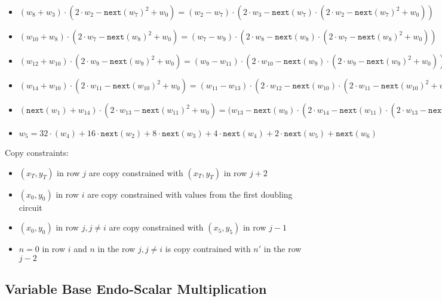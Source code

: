 \begin{itemize}
    \item $(w_{8} + w_{3}) \cdot (2 \cdot w_2 - \texttt{next}(w_7)^2 + w_{0}) = (w_2 - w_7) \cdot (2\cdot w_{3} - \texttt{next}(w_7) \cdot (2 \cdot w_2 - \texttt{next}(w_7)^2 + w_{0}))$
    \item $(w_{10} + w_{8}) \cdot (2 \cdot w_7 - \texttt{next}(w_8)^2 + w_{0}) = (w_7 - w_9) \cdot (2\cdot w_{8} - \texttt{next}(w_8) \cdot (2 \cdot w_7 - \texttt{next}(w_8)^2 + w_{0}))$
    \item $(w_{12} + w_{10}) \cdot (2 \cdot w_9 - \texttt{next}(w_9)^2 + w_{0}) = (w_9 - w_{11}) \cdot (2\cdot w_{10} - \texttt{next}(w_9) \cdot (2 \cdot w_9 - \texttt{next}(w_9)^2 + w_{0}))$
    \item $(w_{14} + w_{10}) \cdot  (2 \cdot w_{11} - \texttt{next}(w_{10})^2 + w_{0}) = (w_{11} - w_{13}) \cdot (2\cdot w_{12} - \texttt{next}(w_{10}) \cdot (2 \cdot w_{11} - \texttt{next}(w_{10})^2 + w_{0}))$
    \item $(\texttt{next}(w_{1}) + w_{14}) \cdot (2 \cdot w_{13} - \texttt{next}(w_{11})^2 + w_{0}) = (w_{13} - \texttt{next}(w_{0}) \cdot (2\cdot w_{14} - \texttt{next}(w_{11}) \cdot (2 \cdot w_{13} - \texttt{next}(w_{11})^2 + w_{0}))$ \\
    
    
    \item $w_5 = 32 \cdot (w_4) + 16 \cdot \texttt{next}(w_{2}) + 8 \cdot \texttt{next}(w_{3}) + 4 \cdot \texttt{next}(w_{4}) + 2 \cdot \texttt{next}(w_{5}) + \texttt{next}(w_{6})$
    \end{itemize}
    
    Copy constraints:
    \begin{itemize}
    \item $(x_T,y_T)$ in row $j$ are copy constrained with $(x_T,y_T)$ in row $j + 2$ 
    \item $(x_0,y_0)$ in row $i$ are copy constrained with values from the first doubling circuit
    \item $(x_0,y_0)$ in row $j, j \neq i$ are copy constrained with $(x_5,y_5)$ in row $j - 1$ 
    \item $n = 0$ in row $i$ and $n$ in the row $j, j \neq i$ is copy contrained with $n'$ in the row $j-2$
    \end{itemize}

\subsection{Variable Base Endo-Scalar Multiplication}

